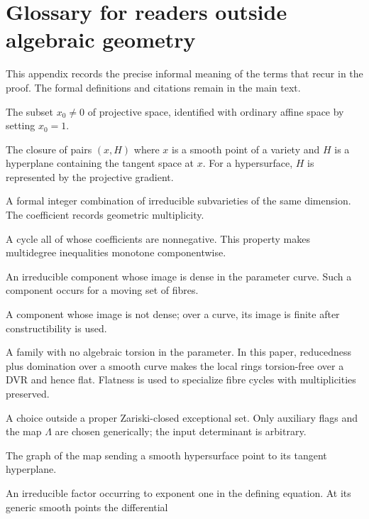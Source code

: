 \documentclass[acmsmall,screen,nonacm]{acmart}
\theoremstyle{definition}
\theoremstyle{remark}
\begin{document}
\appendix

\section{Glossary for readers outside algebraic geometry}\label{app:glossary}

This appendix records the precise informal meaning of the terms that recur in
the proof.  The formal definitions and citations remain in the main text.

\begin{description}[style=nextline,leftmargin=3.0cm,labelwidth=2.7cm,itemsep=3pt]
\item[Affine chart] The subset $x_0\ne0$ of projective space, identified with
ordinary affine space by setting $x_0=1$.
\item[Conormal variety] The closure of pairs $(x,H)$ where $x$ is a smooth
point of a variety and $H$ is a hyperplane containing the tangent space at
$x$.  For a hypersurface, $H$ is represented by the projective gradient.
\item[Cycle] A formal integer combination of irreducible subvarieties of the
same dimension.  The coefficient records geometric multiplicity.
\item[Effective cycle] A cycle all of whose coefficients are nonnegative.
This property makes multidegree inequalities monotone componentwise.
\item[Dominating component] An irreducible component whose image is dense in
the parameter curve.  Such a component occurs for a moving set of fibres.
\item[Vertical component] A component whose image is not dense; over a curve,
its image is finite after constructibility is used.
\item[Flat family] A family with no algebraic torsion in the parameter.  In
this paper, reducedness plus domination over a smooth curve makes the local
rings torsion-free over a DVR and hence flat.  Flatness is used to specialize
fibre cycles with multiplicities preserved.
\item[Generic choice] A choice outside a proper Zariski-closed exceptional
set.  Only auxiliary flags and the map $\Lambda$ are chosen generically; the
input determinant is arbitrary.
\item[Gauss graph] The graph of the map sending a smooth hypersurface point to
its tangent hyperplane.
\item[Multiplicity-one component] An irreducible factor occurring to exponent
one in the defining equation.  At its generic smooth points the differential

\end{description}
\end{document}
